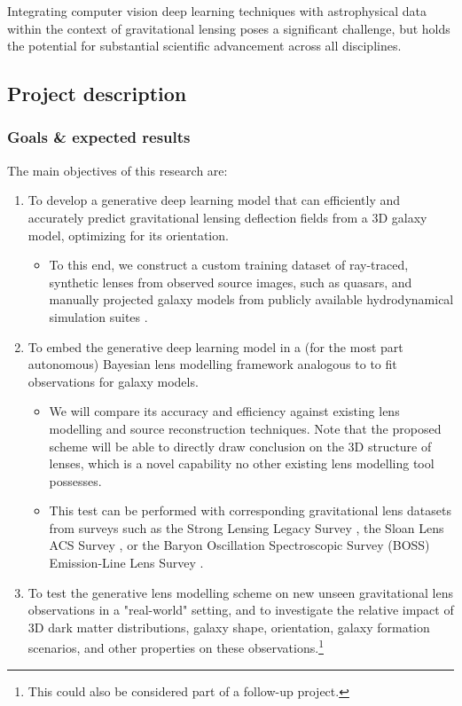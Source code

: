 \documentclass[a4paper,10pt]{article}
\begin{document}
Integrating computer vision deep learning techniques with
astrophysical data within the context of gravitational lensing poses a
significant challenge, but holds the potential for substantial
scientific advancement across all disciplines.

\subsection{Project description}
\label{sec:orgf496503}


\subsubsection{Goals \& expected results}
\label{sec:org90eab6c}
\label{sec:goals}

The main objectives of this research are:
\begin{enumerate}[leftmargin=*, noitemsep]
\item To develop a generative deep learning model that can efficiently
and accurately predict gravitational lensing deflection fields from
a 3D galaxy model, optimizing for its orientation.
\begin{itemize}[leftmargin=*]
\item To this end, we construct a custom training dataset of
ray-traced, synthetic lenses from observed source images, such as
quasars, and manually projected galaxy models from publicly
available hydrodynamical simulation suites
\citep{Springel17,Nelson18,Dave19}.
\end{itemize}
\item To embed the generative deep learning model in a (for the most part
autonomous) Bayesian lens modelling framework analogous to
\cite{Adam22,Denzel21,Morningstar19,Hezaveh17} to fit
observations for galaxy models.
\begin{itemize}[leftmargin=*]
\item We will compare its accuracy and efficiency against existing lens
modelling and source reconstruction techniques. Note that the
proposed scheme will be able to directly draw conclusion on the
3D structure of lenses, which is a novel capability no other
existing lens modelling tool possesses.
\item This test can be performed with corresponding gravitational lens
datasets from surveys such as the Strong Lensing Legacy Survey
\citep[SL2S:][]{Gavazzi12,Sonnenfeld15}, the Sloan Lens ACS
Survey \citep[SLACS:][]{Bolton2006,Shu17}, or the Baryon
Oscillation Spectroscopic Survey (BOSS) Emission-Line Lens Survey
\citep[BELLS:][]{Brownstein11,Shu2016}.
\end{itemize}
\item To test the generative lens modelling scheme on new unseen
gravitational lens observations in a "real-world" setting, and to
investigate the relative impact of 3D dark matter distributions,
galaxy shape, orientation, galaxy formation scenarios, and other
properties on these observations.\footnote{This could also be considered part of a follow-up project.}
\end{enumerate}
\end{document}
